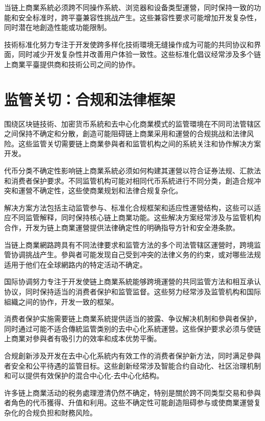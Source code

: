 \documentclass[
  Letterpaper,
]{scrbook}
\begin{document}
当链上商業系統必须跨不同操作系統、浏览器和设备类型運營，同时保持一致的功能和安全标准时，跨平臺兼容性挑战产生。这些兼容性要求可能增加开发复杂性，同时潜在地創造性能或功能限制。

技術标准化努力专注于开发使跨多样化技術環境无缝操作成为可能的共同协议和界面，同时减少开发复杂性并改善用户体验一致性。这些标准化倡议经常涉及多个链上商業平臺提供商和技術公司之间的协作。

\section{监管关切：合规和法律框架}\label{ux76d1ux7ba1ux5173ux5207ux5408ux89c4ux548cux6cd5ux5f8bux6846ux67b6}

围绕区块链技術、加密货币系統和去中心化商業模式的监管環境在不同司法管辖区之间保持不确定和分散，創造可能阻碍链上商業采用和運營的合规挑战和法律风险。这些监管关切需要链上商業參與者和监管机构之间的系統关注和协作解决方案开发。

代币分类不确定性影响链上商業系統必须如何构建其運營以符合证券法规、汇款法和消费者保护要求。不同监管机构可能对相同代币系統进行不同分类，創造合规冲突和運營不确定性，这些使商業规划和法律合规复杂化。

解决方案方法包括主动监管参与、标准化合规框架和适应性運營结构，这些可以适应不同监管解释，同时保持核心链上商業功能。这些解决方案经常涉及与监管机构合作，开发为链上商業運營提供法律确定性的明确指导方针和安全港条款。

当链上商業網路跨具有不同法律要求和监管方法的多个司法管辖区運營时，跨境监管协调挑战产生。參與者可能发现自己受到冲突的法律义务的约束，或对哪些法规适用于他们在全球網路内的特定活动不确定。

国际协调努力专注于开发使链上商業系統能够跨境運營的共同监管方法和相互承认协议，同时保持适当的消费者保护和监管监督。这些努力经常涉及监管机构和国际組織之间的协作，开发一致的框架。

消费者保护实施需要链上商業系統提供适当的披露、争议解决机制和參與者保护，同时通过可能不适合傳統监管类别的去中心化系統運營。这些保护要求必须与使链上商業对參與者有吸引力的效率和成本优势平衡。

合规創新涉及开发在去中心化系統内有效工作的消费者保护新方法，同时满足參與者安全和公平待遇的监管目标。这些創新经常涉及智能合约自动化、社区治理机制和可以提供有效保护的混合中心化-去中心化结构。

许多链上商業活动的税务處理澄清仍然不确定，特别是關於跨不同类型交易和參與者角色的代币獲得、升值和利用。这些不确定性可能創造阻碍参与或使商業運營复杂化的合规负担和財務风险。
\end{document}
